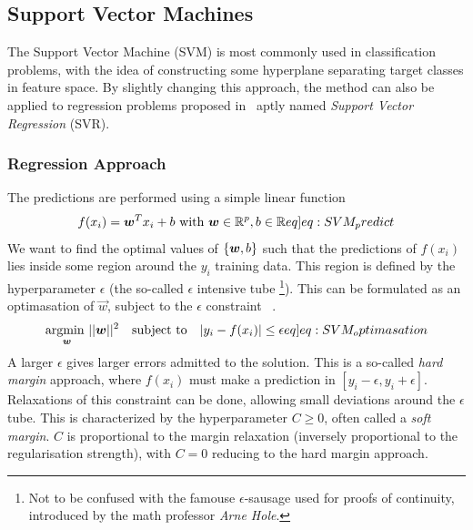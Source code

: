         \subsection{Support Vector Machines}
            The Support Vector Machine (SVM) is most commonly used in classification problems, with the idea of constructing some hyperplane separating target classes in feature space. By slightly changing this approach, the method can also be applied to regression problems proposed in~\citep{SVR} aptly named \textit{Support Vector Regression} (SVR). 
            
            \subsubsection{Regression Approach}
                The predictions are performed using a simple linear function
                \begin{align}
                    f(x_i) = \vec{w}^T x_i + b \text{ with } \vec{w} \in \mathbb{R}^p, b \in \mathbb{R} \label[eq]{eq:SVM_predict} 
                \end{align}
                We want to find the optimal values of $\{\boldsymbol{w}, b\}$ such that the predictions of $f(x_i)$ lies inside some region around the $y_i$ training data. This region is defined by the hyperparameter $\epsilon$ (the so-called $\epsilon$ intensive tube \footnote{Not to be confused with the famouse $\epsilon$-sausage used for proofs of continuity, introduced by the math professor \textit{Arne Hole}.}). This can be formulated as an optimasation of $\vec{w}$, subject to the $\epsilon$ constraint ~\citep{SVRgood}.  
                \begin{align}
                    \underset{\vec{w}}{\text{argmin  }}   ||\vec{w}||^2 
                    \hspace{10px}\text{subject to}\hspace{10px} |y_i - f(x_i)| \leq \epsilon \label[eq]{eq:SVM_optimasation}
                \end{align}
                A larger $\epsilon$ gives larger errors admitted to the solution. This is a so-called \textit{hard margin} approach, where $f(x_i)$ must make a prediction in $[y_i - \epsilon, y_i + \epsilon]$. Relaxations of this constraint can be done, allowing small deviations around the $\epsilon$ tube. This is characterized by the hyperparameter $C \geq 0$, often called a \textit{soft margin}. $C$ is proportional to the margin relaxation (inversely proportional to the regularisation strength), with $C = 0$ reducing to the hard margin approach.
            
